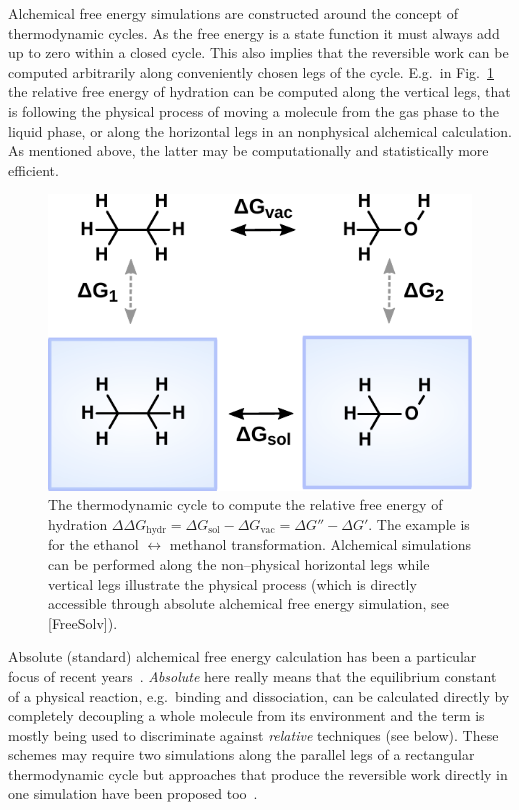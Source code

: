 \documentclass[journal=jctcce,manuscript=article]{achemso}
\begin{document}
Alchemical free energy simulations are constructed around the concept
of thermodynamic cycles.  As the free energy is a state function it
must always add up to zero within a closed cycle.  This also implies
that the reversible work can be computed arbitrarily along
conveniently chosen legs of the cycle.  E.g.\ in
Fig.~\ref{fig:thermocycle} the relative free energy of hydration can
be computed along the vertical legs, that is following the physical
process of moving a molecule from the gas phase to the liquid phase,
or along the horizontal legs in an nonphysical alchemical calculation.
As mentioned above, the latter may be computationally and
statistically more efficient.

\begin{figure}[ht]
  \includegraphics[scale=1.0]{figures/thermocycle.pdf}
  \caption{The thermodynamic cycle to compute the relative free energy
    of hydration
    $\Delta\Delta G_{\mathrm{hydr}}=\Delta G_{\mathrm{sol}}-\Delta
    G_{\mathrm{vac}}=\Delta G'' - \Delta G'$.  The example is for the
    ethanol $\leftrightarrow$ methanol transformation.  Alchemical
    simulations can be performed along the non--physical horizontal
    legs while vertical legs illustrate the physical process (which is
    directly accessible through absolute alchemical free energy
    simulation, see [FreeSolv]).}
  \label{fig:thermocycle}
\end{figure}

Absolute (standard) alchemical free energy calculation has been a
particular focus of recent years~\cite{GILSON19971047,
  doi:10.1021/jp0217839, deng_computations_2009,
  ytreberg_comparison_2006, doi:10.1021/ct500964e}.  \emph{Absolute}
here really means that the equilibrium constant of a physical
reaction, e.g.\ binding and dissociation, can be calculated directly
by completely decoupling a whole molecule from its environment and the
term is mostly being used to discriminate against \emph{relative}
techniques (see below).  These schemes may require two simulations
along the parallel legs of a rectangular thermodynamic cycle but
approaches that produce the reversible work directly in one simulation
have been proposed too~\cite{doi:10.1063/1.3519057, C3FD00125C}.
\end{document}
